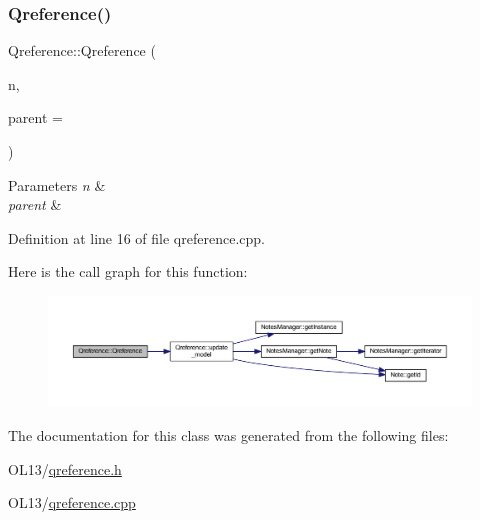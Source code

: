 \subsubsection{\texorpdfstring{Qreference()}{Qreference()}}
{\footnotesize\ttfamily Qreference\+::\+Qreference (\begin{DoxyParamCaption}\item[{\hyperlink{class_note}{Note} \&}]{n,  }\item[{Q\+Widget $\ast$}]{parent = {} }\end{DoxyParamCaption})\hspace{0.3cm}{\ttfamily [explicit]}}


\begin{DoxyParams}{Parameters}
{\em n} & \\
\hline
{\em parent} & \\
\hline
\end{DoxyParams}


Definition at line 16 of file qreference.\+cpp.

Here is the call graph for this function\+:\nopagebreak
\begin{figure}[H]
\begin{center}
\leavevmode
\includegraphics[width=350pt]{class_qreference_ab95224276a2abcdd26376291da58da47_cgraph}
\end{center}
\end{figure}


The documentation for this class was generated from the following files\+:\begin{DoxyCompactItemize}
\item 
O\+L13/\hyperlink{qreference_8h}{qreference.\+h}\item 
O\+L13/\hyperlink{qreference_8cpp}{qreference.\+cpp}\end{DoxyCompactItemize}
